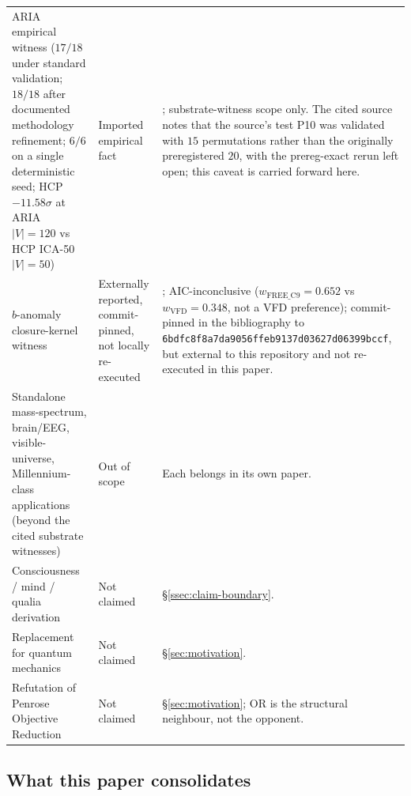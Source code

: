 \documentclass[11pt]{article}
\theoremstyle{definition}
\begin{document}
\begin{longtable}{>{\raggedright\arraybackslash}p{}>{\raggedright\arraybackslash}p{}>{\raggedright\arraybackslash}p{}}
ARIA empirical witness ($17/18$ under standard validation; $18/18$ after documented methodology refinement; $6/6$ on a single deterministic seed; HCP $-11.58\sigma$ at ARIA $|V| = 120$ vs HCP ICA-50 $|V| = 50$)
& Imported empirical fact
& \cite{SmartARIAChess}; substrate-witness scope only. The cited source notes that the source's test P10 was validated with $15$ permutations rather than the originally preregistered $20$, with the prereg-exact rerun left open; this caveat is carried forward here. \\
$b$-anomaly closure-kernel witness
& Externally reported, commit-pinned, not locally re-executed
& \cite{SmartBAnomaly}; AIC-inconclusive ($w_{\mathrm{FREE\_C9}} = 0.652$ vs $w_{\mathrm{VFD}} = 0.348$, not a VFD preference); commit-pinned in the bibliography to \texttt{6bdfc8f8a7da9056ffeb9137d03627d06399bccf}, but external to this repository and not re-executed in this paper. \\
Standalone mass-spectrum, brain/EEG, visible-universe, Millennium-class applications (beyond the cited substrate witnesses)
& Out of scope
& Each belongs in its own paper. \\
Consciousness / mind / qualia derivation
& Not claimed
& \S\ref{ssec:claim-boundary}. \\
Replacement for quantum mechanics
& Not claimed
& \S\ref{sec:motivation}. \\
Refutation of Penrose Objective Reduction
& Not claimed
& \S\ref{sec:motivation}; OR is the structural neighbour, not the opponent. \\
\bottomrule
\end{longtable}

\subsection{What this paper consolidates}
\end{document}
